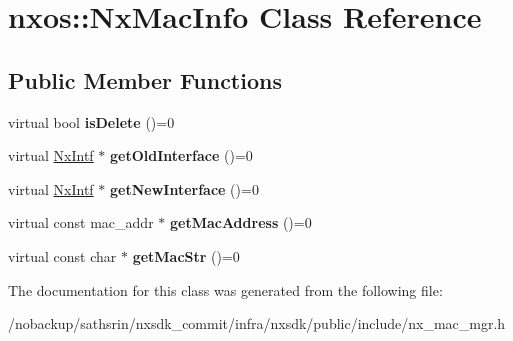 \hypertarget{classnxos_1_1NxMacInfo}{\section{nxos\-:\-:Nx\-Mac\-Info Class Reference}
\label{classnxos_1_1NxMacInfo}
}
\subsection*{Public Member Functions}
\begin{DoxyCompactItemize}
\item 
\hypertarget{classnxos_1_1NxMacInfo_a88de75375b902dfad379b1cace3c7ded}{virtual bool {\bfseries is\-Delete} ()=0}\label{classnxos_1_1NxMacInfo_a88de75375b902dfad379b1cace3c7ded}

\item 
\hypertarget{classnxos_1_1NxMacInfo_ae7903eb49dede081a3d42e5610c6a785}{virtual \hyperlink{classnxos_1_1NxIntf}{Nx\-Intf} $\ast$ {\bfseries get\-Old\-Interface} ()=0}\label{classnxos_1_1NxMacInfo_ae7903eb49dede081a3d42e5610c6a785}

\item 
\hypertarget{classnxos_1_1NxMacInfo_a530a576b559624caa0947010de180522}{virtual \hyperlink{classnxos_1_1NxIntf}{Nx\-Intf} $\ast$ {\bfseries get\-New\-Interface} ()=0}\label{classnxos_1_1NxMacInfo_a530a576b559624caa0947010de180522}

\item 
\hypertarget{classnxos_1_1NxMacInfo_a96d3a8814c0e9839aa23a3fd872547a0}{virtual const mac\-\_\-addr $\ast$ {\bfseries get\-Mac\-Address} ()=0}\label{classnxos_1_1NxMacInfo_a96d3a8814c0e9839aa23a3fd872547a0}

\item 
\hypertarget{classnxos_1_1NxMacInfo_ab82d8db6d0cc05c3aa6445eec23e42cf}{virtual const char $\ast$ {\bfseries get\-Mac\-Str} ()=0}\label{classnxos_1_1NxMacInfo_ab82d8db6d0cc05c3aa6445eec23e42cf}

\end{DoxyCompactItemize}


The documentation for this class was generated from the following file\-:\begin{DoxyCompactItemize}
\item 
/nobackup/sathsrin/nxsdk\-\_\-commit/infra/nxsdk/public/include/nx\-\_\-mac\-\_\-mgr.\-h\end{DoxyCompactItemize}
